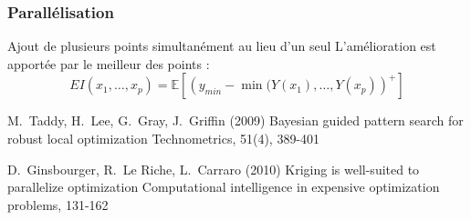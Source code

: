 \begin{frame}
\frametitle{Parallélisation}

\begin{block}{Ajout de plusieurs points simultanément au lieu d'un seul}
L'amélioration est apportée par le meilleur des points :
$$EI(x_1, \ldots, x_p) = \mathbb{E} \left[ \left(y_{min} - \min(Y(x_1), \ldots, Y(x_p) \right)^+   \right]$$
\end{block}

\scriptsize{
 \begin{thebibliography}{7}
\beamertemplatearticlebibitems
     M.~Taddy, H.~Lee, G.~Gray, J.~Griffin (2009)
         \newblock Bayesian guided pattern search for robust local optimization
         \newblock Technometrics, 51(4), 389-401

     D.~Ginsbourger, R.~Le Riche, L.~Carraro (2010)
         \newblock Kriging is well-suited to parallelize optimization
         \newblock Computational intelligence in expensive optimization problems, 131-162 
 \end{thebibliography}
}
\end{frame}

